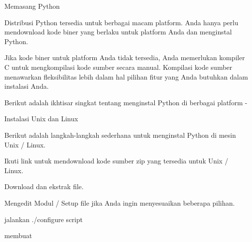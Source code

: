 \noindent 
{\fontsize{14pt}{14pt}\selectfont Memasang Python \\} \par
\noindent 
{\fontsize{14pt}{14pt}\selectfont Distribusi Python tersedia untuk berbagai macam platform. Anda hanya perlu mendownload kode biner yang berlaku untuk platform Anda dan menginstal Python. \\} \par
\vspace{14pt}
\noindent 
{\fontsize{14pt}{14pt}\selectfont Jika kode biner untuk platform Anda tidak tersedia, Anda memerlukan kompiler C untuk mengkompilasi kode sumber secara manual. Kompilasi kode sumber menawarkan fleksibilitas lebih dalam hal pilihan fitur yang Anda butuhkan dalam instalasi Anda. \\} \par
\vspace{14pt}
\noindent 
{\fontsize{14pt}{14pt}\selectfont Berikut adalah ikhtisar singkat tentang menginstal Python di berbagai platform - \\} \par
\vspace{14pt}
\noindent 
{\fontsize{14pt}{14pt}\selectfont Instalasi Unix dan Linux \\} \par
\noindent 
{\fontsize{14pt}{14pt}\selectfont Berikut adalah langkah-langkah sederhana untuk menginstal Python di mesin Unix / Linux. \\} \par
\noindent 
{\fontsize{14pt}{14pt}\selectfont Ikuti link untuk mendownload kode sumber zip yang tersedia untuk Unix / Linux. \\} \par
\vspace{14pt}
\noindent 
{\fontsize{14pt}{14pt}\selectfont Download dan ekstrak file. \\} \par
\vspace{14pt}
\noindent 
{\fontsize{14pt}{14pt}\selectfont Mengedit Modul / Setup file jika Anda ingin menyesuaikan beberapa pilihan. \\} \par
\vspace{14pt}
\noindent 
{\fontsize{14pt}{14pt}\selectfont jalankan ./configure script \\} \par
\vspace{14pt}
\noindent 
{\fontsize{14pt}{14pt}\selectfont membuat \\} \par
